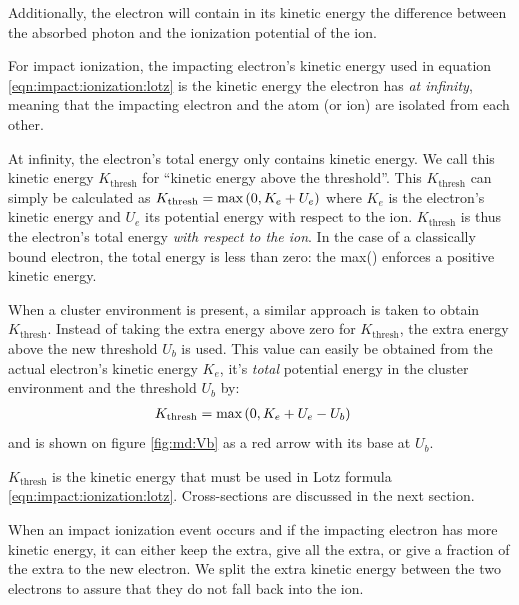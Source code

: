 Additionally, the electron will contain in its kinetic energy the difference
between the absorbed photon and the ionization potential of the ion.



For impact ionization, the impacting electron's kinetic energy used in equation
\eqref{eqn:impact:ionization:lotz} is the kinetic energy the electron has
\textit{at infinity}, meaning that the impacting electron and the atom (or ion)
are isolated from each other.


At infinity, the electron's total energy only contains kinetic
energy. We call this kinetic energy $K_{\textrm{thresh}}$ for ``kinetic energy
above the threshold''. This $K_{\textrm{thresh}}$ can simply be calculated
as $K_{\textrm{thresh}} = \textrm{max}\left( 0, K_e + U_e \right)$
where $K_e$ is the
electron's kinetic energy and $U_e$ its potential energy with respect to the ion.
$K_{\textrm{thresh}}$ is thus the electron's total energy \textit{with respect
to the ion}.
In the case of a classically bound electron, the total energy is less than zero:
the max() enforces a positive kinetic energy.

When a cluster environment is present, a similar approach is taken to obtain
$K_{\textrm{thresh}}$. Instead of taking the extra energy above zero for
$K_{\textrm{thresh}}$, the extra energy above the new threshold $U_b$ is used.
This value can easily be obtained from the actual electron's kinetic energy
$K_e$, it's \textit{total} potential energy in the cluster environment and the
threshold $U_b$ by:
\begin{align}
K_{\textrm{thresh}} & = \textrm{max}\left( 0, K_e + U_e - U_b \right)
\label{eqn:md:kthresh}
\end{align}
and is shown on figure \ref{fig:md:Vb} as a red arrow with its base at $U_b$.


$K_{\textrm{thresh}}$ is the kinetic energy that must be used in Lotz formula
\eqref{eqn:impact:ionization:lotz}. Cross-sections are discussed in the next
section.


When an impact ionization event occurs and if the impacting electron has more kinetic
energy, it can either keep the extra, give all the extra, or give a fraction of
the extra to the new electron. We split the extra kinetic energy between the two
electrons to assure that they do not fall back
into the ion.



